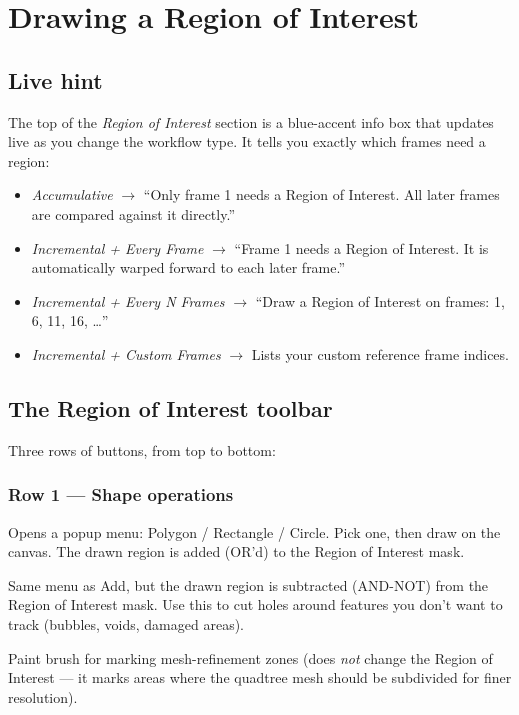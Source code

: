 \section{Drawing a Region of Interest}
\label{sec:region-of-interest}

\subsection{Live hint}

The top of the \emph{Region of Interest} section is a blue-accent
info box that updates live as you change the workflow type. It tells
you exactly which frames need a region:

\begin{itemize}
  \item \emph{Accumulative} $\to$ ``Only frame 1 needs a Region of
    Interest. All later frames are compared against it directly.''
  \item \emph{Incremental + Every Frame} $\to$ ``Frame 1 needs a
    Region of Interest. It is automatically warped forward to each
    later frame.''
  \item \emph{Incremental + Every N Frames} $\to$ ``Draw a Region of
    Interest on frames: 1, 6, 11, 16, \ldots''
  \item \emph{Incremental + Custom Frames} $\to$ Lists your custom
    reference frame indices.
\end{itemize}

\subsection{The Region of Interest toolbar}

Three rows of buttons, from top to bottom:

\subsubsection*{Row 1 --- Shape operations}

\begin{description}[leftmargin=1.2cm,style=nextline]
  \item[+ Add $\blacktriangledown$]
    Opens a popup menu: Polygon / Rectangle / Circle. Pick one, then
    draw on the canvas. The drawn region is added (OR'd) to the
    Region of Interest mask.
  \item[Cut $\blacktriangledown$]
    Same menu as Add, but the drawn region is subtracted (AND-NOT)
    from the Region of Interest mask. Use this to cut holes around
    features you don't want to track (bubbles, voids, damaged
    areas).
  \item[+ Refine $\blacktriangledown$]
    Paint brush for marking mesh-refinement zones (does \emph{not}
    change the Region of Interest --- it marks areas where the
    quadtree mesh should be subdivided for finer resolution).
\end{description}

